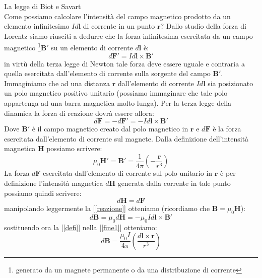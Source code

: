 \documentclass[a4paper,10pt,oneside]{article}
\begin{document}
{\Large La legge di Biot e Savart}\\


\vspace{3cm}
Come possiamo calcolare l'intensità del campo magnetico prodotto da un elemento infinitesimo $Id\mathbf{l}$ di corrente in un punto $\mathbf{r}$?
Dallo studio della forza di Lorentz siamo riusciti a dedurre che la forza infinitesima esercitata da un campo magnetico \footnote{generato da un magnete permanente o da una distribuzione di corrente}$\mathbf{B'}$ su un elemento di corrente $d\mathbf{l}$ è:
\begin{equation}
 d\mathbf{F'}=Id\mathbf{l}\times \mathbf{B'}
\end{equation}
in virtù della terza legge di Newton tale forza deve essere uguale e contraria a quella esercitata dall'elemento di corrente sulla sorgente del campo $\mathbf{B'}$. Immaginiamo che ad una distanza $\mathbf{r}$ dall'elemento di corrente $Id\mathbf{l}$ sia posizionato un polo magnetico positivo unitario (possiamo immaginare che tale polo appartenga ad una barra magnetica molto lunga).
Per la terza legge della dinamica la forza di reazione dovrà essere allora:
\begin{equation}\label{reazione}
 d\mathbf{F}=-d\mathbf{F'}=-Id\mathbf{l}\times \mathbf{B}'
\end{equation}
Dove $\mathbf{B}'$ è il campo magnetico creato dal polo magnetico in $\mathbf{r}$ e $d\mathbf{F}$ è la forza esercitata dall'elemento di corrente sul magnete. Dalla definizione dell'intensità magnetica $\mathbf{H}$ possiamo scrivere:
\begin{equation}\label{defi}
 \mu_0\mathbf{H}'=\mathbf{B}'=\frac{1}{4\pi}\left(-\frac{\mathbf{r}}{r^3}\right)
\end{equation}
La forza $d\mathbf{F}$ esercitata dall'elemento di corrente sul polo unitario in $\mathbf{r}$ è per definizione l'intensità magnetica $d\mathbf{H}$ generata dalla corrente in tale punto possiamo quindi scrivere:
\begin{equation}
 d\mathbf{H}=d\mathbf{F}
\end{equation}
manipolando leggermente la [\ref{reazione}] otteniamo (ricordiamo che $\mathbf{B}=\mu_0\mathbf{H}$):
\begin{equation}\label{fine1}
 d\mathbf{B}=\mu_0d\mathbf{H}=-\mu_0Id\mathbf{l}\times \mathbf{B}'
\end{equation}
sostituendo ora la [\ref{defi}] nella [\ref{fine1}] otteniamo:
\begin{equation}
 d\mathbf{B}=\frac{\mu_0I}{4\pi}\left(\frac{d\mathbf{l}\times \mathbf{r}}{r^3}\right)
\end{equation}
\end{document}
